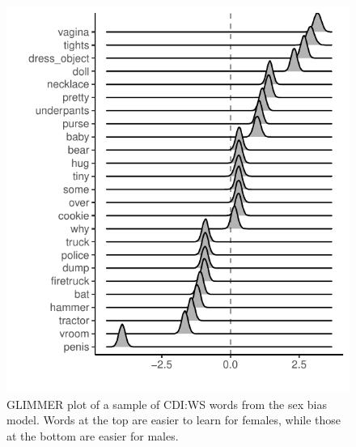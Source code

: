 \documentclass[10pt, letterpaper]{article}
\newenvironment{CodeChunk}{}{}
\begin{document}
\begin{CodeChunk}
\begin{figure}[H]

{\centering \includegraphics[width=\linewidth]{figs/smGLIMMER_sex_prodWS} 

}

\caption[GLIMMER plot of a sample of CDI:WS words from the sex bias model]{GLIMMER plot of a sample of CDI:WS words from the sex bias model. Words at the top are easier to learn for females, while those at the bottom are easier for males.}\label{fig:sex-glimmer}
\end{figure}
\end{CodeChunk}
\end{document}

